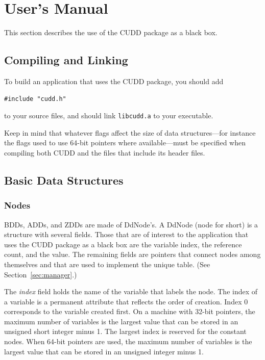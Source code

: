 \documentclass[11pt]{article}
\begin{document}
\section{User's Manual}
\label{sec:user}

This section describes the use of the CUDD package as a black box.

\subsection{Compiling and Linking}
\label{sec:compileExt}

To build an application that uses the CUDD package, you should add
\begin{verbatim}
#include "cudd.h"
\end{verbatim}
to your source files, and should link
\verb|libcudd.a| to your executable.

Keep in mind that whatever flags affect the size of data
structures---for instance the flags used to use 64-bit pointers where
available---must be specified when compiling both CUDD and the files
that include its header files.

\subsection{Basic Data Structures}
\label{sec:struct}

\subsubsection{Nodes}
\label{sec:nodes}

BDDs, ADDs, and ZDDs are made of DdNode's. A DdNode
(node for short) is a structure with several fields. Those
that are of interest to the application that uses the CUDD package as
a black box are the variable index, the
reference count, and the value. The
remaining fields are pointers that connect nodes among themselves and
that are used to implement the unique table. (See
Section~\ref{sec:manager}.)

The \emph{index} field holds the name of the variable that labels the
node. The index of a variable is a permanent attribute that reflects
the order of creation.  Index 0 corresponds to
the variable created first. On a machine with 32-bit pointers, the
maximum number of variables is the largest value that can be stored in
an unsigned short integer minus 1. The largest index is reserved for
the constant nodes. When 64-bit pointers are
used, the maximum number of variables is the largest value that can be
stored in an unsigned integer minus 1.
\end{document}

